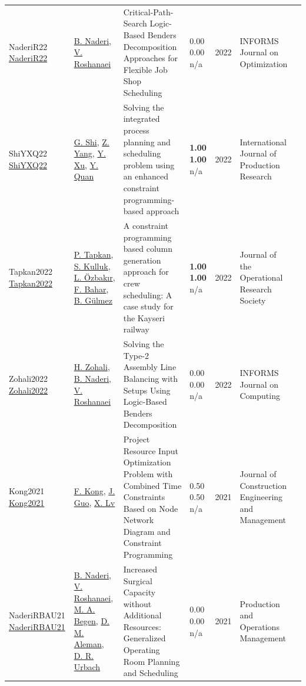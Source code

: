 {\begin{longtable}{p{3cm}p{5cm}p{10cm}p{1cm}rp{2.5cm}l}
NaderiR22 \href{http://dx.doi.org/10.1287/ijoo.2021.0056}{NaderiR22} & \hyperref[auth:a725]{B. Naderi}, \hyperref[auth:a727]{V. Roshanaei} & Critical-Path-Search Logic-Based Benders Decomposition Approaches for Flexible Job Shop Scheduling & \noindent{}\textcolor{black!50}{0.00} \textcolor{black!50}{0.00} n/a & 2022 & \cellcolor{red!20}INFORMS Journal on Optimization & \cite{NaderiR22}\\
ShiYXQ22 \href{https://doi.org/10.1080/00207543.2021.1963496}{ShiYXQ22} & \hyperref[auth:a445]{G. Shi}, \hyperref[auth:a446]{Z. Yang}, \hyperref[auth:a447]{Y. Xu}, \hyperref[auth:a448]{Y. Quan} & Solving the integrated process planning and scheduling problem using an enhanced constraint programming-based approach & \noindent{}\textbf{1.00} \textbf{1.00} n/a & 2022 & \cellcolor{red!20}International Journal of Production Research & \cite{ShiYXQ22}\\
Tapkan2022 \href{http://dx.doi.org/10.1080/01605682.2022.2125843}{Tapkan2022} & \hyperref[auth:a1784]{P. Tapkan}, \hyperref[auth:a1785]{S. Kulluk}, \hyperref[auth:a1786]{L. Özbakır}, \hyperref[auth:a1787]{F. Bahar}, \hyperref[auth:a1788]{B. Gülmez} & A constraint programming based column generation approach for crew scheduling: A case study for the Kayseri railway & \noindent{}\textbf{1.00} \textbf{1.00} n/a & 2022 & \cellcolor{red!20}Journal of the Operational Research Society & \cite{Tapkan2022}\\
Zohali2022 \href{http://dx.doi.org/10.1287/ijoc.2020.1015}{Zohali2022} & \hyperref[auth:a1524]{H. Zohali}, \hyperref[auth:a725]{B. Naderi}, \hyperref[auth:a727]{V. Roshanaei} & Solving the Type-2 Assembly Line Balancing with Setups Using Logic-Based Benders Decomposition & \noindent{}\textcolor{black!50}{0.00} \textcolor{black!50}{0.00} n/a & 2022 & \cellcolor{red!20}INFORMS Journal on Computing & \cite{Zohali2022}\\
Kong2021 \href{http://dx.doi.org/10.1061/(asce)co.1943-7862.0002192}{Kong2021} & \hyperref[auth:a1704]{F. Kong}, \hyperref[auth:a1705]{J. Guo}, \hyperref[auth:a1706]{X. Lv} & Project Resource Input Optimization Problem with Combined Time Constraints Based on Node Network Diagram and Constraint Programming & \noindent{}0.50 0.50 n/a & 2021 & Journal of Construction Engineering and Management & \cite{Kong2021}\\
NaderiRBAU21 \href{http://dx.doi.org/10.1111/poms.13397}{NaderiRBAU21} & \hyperref[auth:a725]{B. Naderi}, \hyperref[auth:a727]{V. Roshanaei}, \hyperref[auth:a835]{M. A. Begen}, \hyperref[auth:a894]{D. M. Aleman}, \hyperref[auth:a895]{D. R. Urbach} & Increased Surgical Capacity without Additional Resources: Generalized Operating Room Planning and Scheduling & \noindent{}\textcolor{black!50}{0.00} \textcolor{black!50}{0.00} n/a & 2021 & \cellcolor{red!20}Production and Operations Management & \cite{NaderiRBAU21}\\

\end{longtable}}
